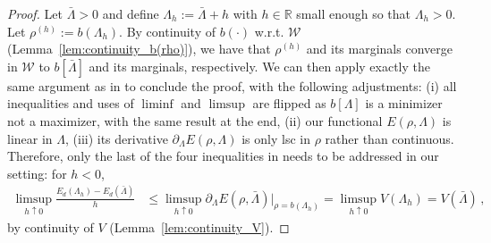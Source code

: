 \documentclass[11pt,a4paper,final]{article}
\def\R{\mathbb R}
\newcommand{\Wass}{\mathscr{W}}
\newcommand{\1}{\mathbf{1}}
\theoremstyle{plain}
\numberwithin{equation}{section}
\numberwithin{theorem}{section}
\begin{document}
\begin{proof}
 Let $\bar\Lambda>0$ and define $\Lambda_h:=\bar \Lambda + h$ with $h\in\R$ small enough so that $\Lambda_h>0$. Let $\rho^{(h)}:=b(\Lambda_h)$.
  By continuity of $b(\cdot)$ w.r.t. $\Wass$ (Lemma~\ref{lem:continuity_b(rho)}), we have that $\rho^{(h)}$ and its marginals converge in $\Wass$ to $b[\bar \Lambda]$ and its marginals, respectively. We can then apply exactly the same argument as in \cite[Proposition B.10]{conger_coupled_2024} to conclude the proof, with the following adjustments: (i) all inequalities and uses of $\liminf$ and $\limsup$ are flipped as $b[\Lambda]$ is a minimizer not a maximizer, with the same result at the end, (ii) our functional $E(\rho,\Lambda)$ is linear in $\Lambda$, (iii) its derivative $\partial_\Lambda E(\rho,\Lambda)$ is only lsc in $\rho$ rather than continuous. Therefore, only the last of the four inequalities in \cite[Proposition B.10]{conger_coupled_2024} needs to be addressed in our setting: for $h<0$, 
  \begin{align*}
      \limsup_{h \uparrow 0} \frac{E_d(\Lambda_h)-E_d(\bar\Lambda)}{h} 
      &\le \limsup_{h \uparrow 0} \partial_\Lambda E(\rho,\bar\Lambda)|_{\rho=b(\Lambda_h)}
      =\limsup_{h \uparrow 0} V(\Lambda_h) =V(\bar\Lambda)\,,
  \end{align*}
  by continuity of $V$ (Lemma~\ref{lem:continuity_V}).
\end{proof}
\end{document}

